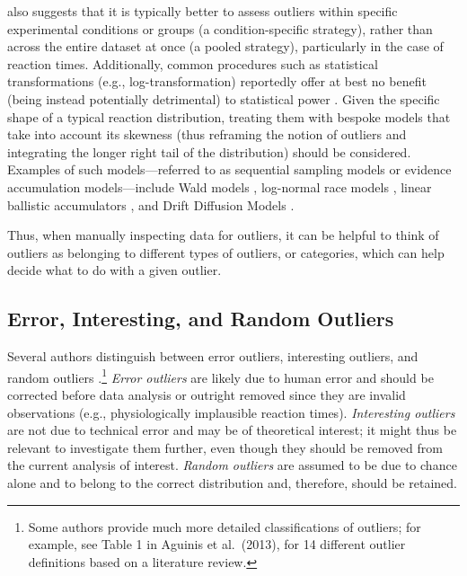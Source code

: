 \documentclass[sn-basic, lineno,pdflatex]{sn-jnl}
\begin{document}
\citet{miller2023outlier} also suggests that it is typically better to
assess outliers within specific experimental conditions or groups (a
condition-specific strategy), rather than across the entire dataset at
once (a pooled strategy), particularly in the case of reaction times.
Additionally, common procedures such as statistical transformations
(e.g., log-transformation) reportedly offer at best no benefit (being
instead potentially detrimental) to statistical power
\citep{schramm2019reaction}. Given the specific shape of a typical
reaction distribution, treating them with bespoke models that take into
account its skewness (thus reframing the notion of outliers and
integrating the longer right tail of the distribution) should be
considered. Examples of such models---referred to as sequential sampling
models or evidence accumulation models---include Wald models
\citep{anders2016shifted}, log-normal race models
\citep{rouder2015lognormal}, linear ballistic accumulators
\citep{brown2008simplest}, and Drift Diffusion Models
\citep{ratcliff2016diffusion}.

Thus, when manually inspecting data for outliers, it can be helpful to
think of outliers as belonging to different types of outliers, or
categories, which can help decide what to do with a given outlier.

\subsection{Error, Interesting, and Random
Outliers}\label{error-interesting-and-random-outliers}

Several authors distinguish between error outliers, interesting
outliers, and random outliers
\citep{aguinis2013best, leys2019outliers}.\footnote{Some authors provide
  much more detailed classifications of outliers; for example, see Table
  1 in Aguinis et al.~(2013), for 14 different outlier definitions based
  on a literature review.} \emph{Error outliers} are likely due to human
error and should be corrected before data analysis or outright removed
since they are invalid observations (e.g., physiologically implausible
reaction times). \emph{Interesting outliers} are not due to technical
error and may be of theoretical interest; it might thus be relevant to
investigate them further, even though they should be removed from the
current analysis of interest. \emph{Random outliers} are assumed to be
due to chance alone and to belong to the correct distribution and,
therefore, should be retained.
\end{document}
